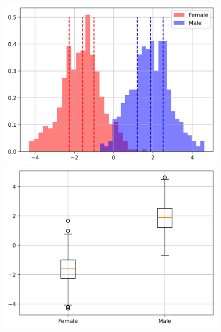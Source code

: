 \documentclass[11pt]{article}
\begin{document}
\begin{figure}[H]
{\begin{minipage}[b]{0.3\textwidth}
            \includegraphics[width=1\textwidth]{../Analysis/LDA/node=25_size=4800_step=4800_rho=0.1/hist_0.jpg}
            \includegraphics[width=1\textwidth]{../Analysis/LDA/node=25_size=4800_step=4800_rho=0.1/box_0.jpg}
        \end{minipage}
    }
\end{figure}
\end{document}
